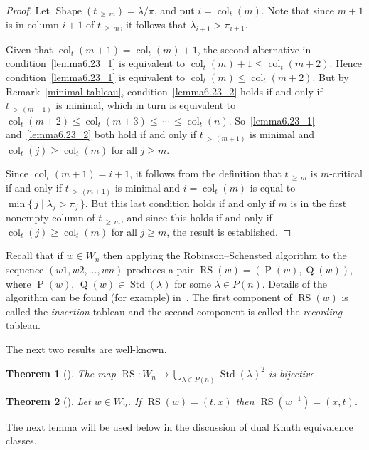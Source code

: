 \documentclass[10pt]{amsart}
\newtheorem{theo}{Theorem}[section]
\theoremstyle{definition}
\DeclareMathOperator{\col}{col}
\newcommand{\morethan}[2]{#1\,{_{>\,#2}}}
\newcommand{\Morethan}[2]{#1\,{_{\geqslant\,#2}}}
\DeclareMathOperator{\STD}{Std}
\DeclareMathOperator{\shape}{Shape}
\DeclareMathOperator{\RS}{RS}
\DeclareMathOperator{\RSP}{P}
\DeclareMathOperator{\RSQ}{Q}
\begin{document}
\begin{proof}
Let $\shape(\Morethan tm)=\lambda/\pi$, and put $i=\col_t(m)$. Note
that since $m+1$ is in column $i+1$ of $\Morethan tm$, it
follows that $\lambda_{i+1}>\pi_{i+1}$.

Given that $\col_t(m+1)=\col_t(m)+1$, the second alternative in condition~\ref{lemma6.23_1} is
equivalent to $\col_t(m)+1\leqslant\col_t(m+2)$. Hence condition~\ref{lemma6.23_1} is
equivalent to $\col_t(m)\leqslant\col_t(m+2)$. But by Remark~\ref{minimal-tableau},
condition~\ref{lemma6.23_2} holds if and only if $\morethan{t}{(m+1)}$ is minimal, which
in turn is equivalent to
$\col_t(m+2)\leqslant\col_t(m+3)\leqslant \, \cdots \, \leqslant \col_t(n)$.
So~\ref{lemma6.23_1} and~\ref{lemma6.23_2} both hold if and only if $\morethan{t}{(m+1)}$ is minimal
and $\col_t(j)\geqslant \col_t(m)$ for all $j\geqslant m$.

Since $\col_t(m+1)=i+1$, it follows from the definition that
$\Morethan tm$ is $m$-critical if and only if $\morethan{t}{(m+1)}$
is minimal and $i=\col_t(m)$ is equal to $\min\{\,j\mid \lambda_j>\pi_j\,\}$.
But this last condition holds if and only if $m$ is in the first nonempty
column of $\Morethan tm$, and since this holds if and only if
$\col_t(j)\geqslant \col_t(m)$ for all $j\geqslant m$, the result is
established.
\end{proof}

Recall that if $w\in W_{n}$ then applying the Robinson--Schensted algorithm
to the sequence $(w1,w2,\ldots,wn)$ produces a pair $\RS(w) = (\RSP(w),\RSQ(w))$,
where $\RSP(w),\,\RSQ(w)\in \STD(\lambda)$ for some $\lambda\in P(n)$. Details
of the algorithm can be found (for example) in~\cite[Section~3.1]{sag:sym}.
The first component of $\RS(w)$ is called the \emph{insertion}
tableau and the second component is called the \emph{recording} tableau.

The next two results are well-known.

\begin{theo}[{\cite[Theorem~3.1.1]{sag:sym}}]\label{rs}
The map $\RS\colon W_n\to\bigcup_{\lambda\in P(n)}\STD(\lambda)^2$ is
bijective.
\end{theo}

\begin{theo}[{\cite[Theorem~3.6.6]{sag:sym}}]\label{rswinv}
Let $w\in W_n$. If $\RS(w) = (t,x)$ then $\RS(w^{-1}) = (x,t)$.
\end{theo}
The next lemma will be used below in the discussion of dual Knuth
equivalence classes.
\end{document}
